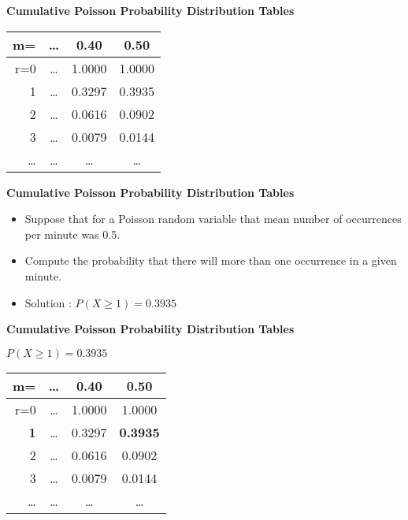 \documentclass[a4]{beamer}
\begin{document}
{
\textbf{Cumulative Poisson Probability Distribution Tables}

\begin{center}
\begin{tabular}{|r||c|c|c|}
  \hline
  m= & \ldots & 0.40 & 0.50 \\ \hline \hline
  r=0 & \ldots & 1.0000 & 1.0000 \\
  1 & \ldots & 0.3297 & 0.3935 \\
  2 & \ldots & 0.0616 & 0.0902 \\
  3 & \ldots & 0.0079 & 0.0144 \\
  \ldots & \ldots & \ldots & \ldots \\
  \hline
\end{tabular}
\end{center}

}

{
\textbf{Cumulative Poisson Probability Distribution Tables}

\begin{itemize}
\item Suppose that for a Poisson random variable that mean number of occurrences per minute was 0.5.
\item Compute the probability that there will more than one occurrence in a given minute.
\item Solution : $P(X \geq 1) = 0.3935$
\end{itemize}

}

{
\textbf{Cumulative Poisson Probability Distribution Tables}

$ P(X \geq 1)  = 0.3935$
\begin{center}
\begin{tabular}{|r||c|c|c|}
  \hline
  m= & \ldots & 0.40 & \textbf{0.50} \\ \hline \hline
  r=0 & \ldots & 1.0000 & 1.0000 \\
  \textbf{1} & \ldots & 0.3297 & \textbf{\alert{0.3935}} \\
  2 & \ldots & 0.0616 & 0.0902 \\
  3 & \ldots & 0.0079 & 0.0144 \\
  \ldots & \ldots & \ldots & \ldots \\
  \hline
\end{tabular}
\end{center}

}
\end{document}
